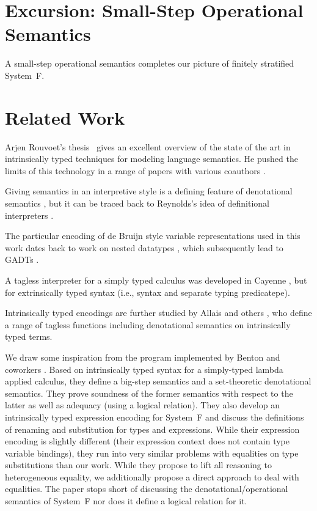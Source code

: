 \documentclass[acmsmall,anonymous,review,screen]{acmart}
\begin{document}

\section{Excursion: Small-Step Operational Semantics}
\label{sec:excurs-small-step}

A small-step operational semantics completes our picture of finitely
stratified System~F. 

\section{Related Work}
\label{sec:related-work}

Arjen Rouvoet's thesis~\cite{DBLP:phd/basesearch/Rouvoet21} gives an
excellent overview of the state of the art in intrinsically typed
techniques for modeling language semantics. He pushed the limits of
this technology in a range of papers with various coauthors
\cite{DBLP:journals/pacmpl/RestPRVM22,DBLP:journals/pacmpl/RouvoetKV21,DBLP:conf/cpp/RouvoetPKV20,DBLP:journals/pacmpl/PoulsenRTKV18}. 

Giving semantics in an interpretive style is a defining feature of
denotational semantics \cite{Schmidt1986}, but it can be traced back
to Reynolds's idea of definitional interpreters \cite{Reynolds1975}.

The particular encoding of de Bruijn style variable representations
used in this work dates back to work on nested datatypes
\cite{DBLP:conf/mpc/BirdM98,DBLP:journals/jfp/BirdP99,DBLP:conf/csl/AltenkirchR99},
which subsequently lead to GADTs
\cite{cheney03:_first_class_phant_types}.

A tagless interpreter for a simply typed calculus was developed in
Cayenne \cite{augustsson99}, but for extrinsically typed syntax (i.e.,
syntax and separate typing predicatepe).

Intrinsically typed encodings are further studied by Allais and others
\cite{DBLP:conf/cpp/Allais0MM17}, who define a range of tagless
functions including denotational semantics on intrinsically typed
terms. 

We draw some inspiration from the program implemented by Benton and coworkers
\cite{DBLP:journals/jar/BentonHKM12}. Based on intrinsically typed
syntax for a simply-typed lambda applied calculus, they define a
big-step semantics and a set-theoretic denotational semantics. They
prove soundness of the former semantics with respect to the latter as
well as adequacy (using a logical relation). They also develop an
intrinsically typed expression encoding for System~F and discuss the
definitions of renaming and substitution for types and expressions.
While their expression encoding is slightly different (their
expression context does not contain type variable bindings), they run
into very similar problems with equalities on type substitutions than
our work. While they propose to lift all reasoning to heterogeneous
equality, we additionally propose a direct approach to deal with
equalities. 
The paper stops short of discussing the denotational/operational
semantics of System~F nor does it define a logical relation for it.
\end{document}
